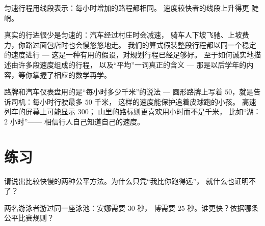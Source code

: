 \begin{omfigure}

{\small 匀速行程用线段表示：每小时增加的路程都相同。
速度较快者的线段上升得更
陡峭。}
\end{omfigure}

\begin{remark}[匀速是一种简化]\label{rem:g5:speed-distance-time:steady}
真实的行进很少是匀速的：汽车经过村庄时会减速，
骑车人下坡飞驰、上坡费力，你路过面包店时也会慢悠悠地走。
我们的算式假装整段行程都以同一个稳定的速度进行 ---
这是一种有用的假设，对规划行程已经足够好。
至于如何诚实地描述由许多段速度组成的行程，
以及“平均”一词真正的含义 ---
那是以后学年的内容，等你掌握了相应的数学再学。
\end{remark}

\begin{example}[认识身边的速度]\label{ex:g5:speed-distance-time:signs}
路牌和汽车仪表盘用的是“每小时多少千米”的说法 ---
圆形路牌上写着 $50$，就是告诉司机：每小时行驶最多 $50$ 千米，
这样的速度能保护追着皮球跑的小孩。
高速列车的屏幕上可能显示 $300$；
山里的路标则更喜欢用小时而不是千米，
比如“湖：2 小时”——
相信行人自己知道自己的速度。
\end{example}

\section{练习}

\begin{exercise}[$\star$]\label{exo:g5:speed-distance-time:1}
请说出比较快慢的两种公平方法。为什么只凭“我比你跑得远”，
就什么也证明不了？
\end{exercise}

\begin{exercise}[$\star$]\label{exo:g5:speed-distance-time:2}
两名游泳者游过同一座泳池：安娜需要 $30$ 秒，
博需要 $25$ 秒。谁更快？依据哪条公平比赛规则？
\end{exercise}

